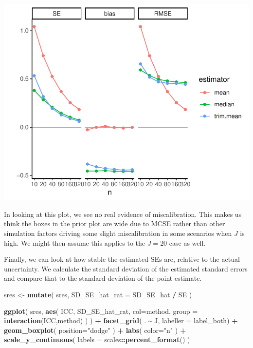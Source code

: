 \documentclass[
]{book}
\newenvironment{Shaded}{\begin{snugshade}}{\end{snugshade}}
\newcommand{\AttributeTok}[1]{\textcolor[rgb]{0.13,0.29,0.53}{#1}}
\newcommand{\FunctionTok}[1]{\textcolor[rgb]{0.13,0.29,0.53}{\textbf{#1}}}
\newcommand{\NormalTok}[1]{#1}
\newcommand{\OtherTok}[1]{\textcolor[rgb]{0.56,0.35,0.01}{#1}}
\newcommand{\SpecialCharTok}[1]{\textcolor[rgb]{0.81,0.36,0.00}{\textbf{#1}}}
\newcommand{\StringTok}[1]{\textcolor[rgb]{0.31,0.60,0.02}{#1}}
\begin{document}
\begin{center}\includegraphics[width=0.75\linewidth]{Designing-Simulations-in-R_files/figure-latex/unnamed-chunk-186-1} \end{center}

In looking at this plot, we see no real evidence of miscalibration.
This makes us think the boxes in the prior plot are wide due to MCSE rather than other simulation factors driving some slight miscalibration in some scenarios when \(J\) is high.
We might then assume this applies to the \(J = 20\) case as well.

Finally, we can look at how stable the estimated SEs are, relative to the actual uncertainty.
We calculate the standard deviation of the estimated standard errors and compare that to the standard deviation of the point estimate.

\begin{Shaded}
\begin{Highlighting}[]
\NormalTok{sres }\OtherTok{\textless{}{-}} \FunctionTok{mutate}\NormalTok{( sres,}
               \AttributeTok{SD\_SE\_hat\_rat =}\NormalTok{ SD\_SE\_hat }\SpecialCharTok{/}\NormalTok{ SE )}

\FunctionTok{ggplot}\NormalTok{( sres,}
        \FunctionTok{aes}\NormalTok{( ICC, SD\_SE\_hat\_rat, }\AttributeTok{col=}\NormalTok{method,}
             \AttributeTok{group =} \FunctionTok{interaction}\NormalTok{(ICC,method) ) ) }\SpecialCharTok{+}
    \FunctionTok{facet\_grid}\NormalTok{( . }\SpecialCharTok{\textasciitilde{}}\NormalTok{ J, }\AttributeTok{labeller =}\NormalTok{ label\_both) }\SpecialCharTok{+}
  \FunctionTok{geom\_boxplot}\NormalTok{( }\AttributeTok{position=}\StringTok{"dodge"}\NormalTok{ ) }\SpecialCharTok{+}
  \FunctionTok{labs}\NormalTok{( }\AttributeTok{color=}\StringTok{"n"}\NormalTok{ ) }\SpecialCharTok{+}
  \FunctionTok{scale\_y\_continuous}\NormalTok{( }\AttributeTok{labels =}\NormalTok{ scales}\SpecialCharTok{::}\FunctionTok{percent\_format}\NormalTok{() ) }
\end{Highlighting}
\end{Shaded}
\end{document}
